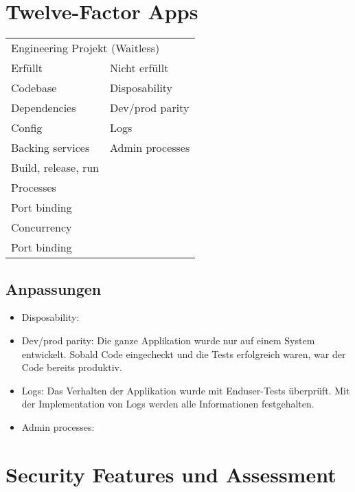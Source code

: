 \documentclass[12pt,a4paper]{article}
\begin{document}
\section{Twelve-Factor Apps}
    \begin{table}[]
        \begin{tabular}{ll}
        \multicolumn{2}{l}{Engineering Projekt (Waitless)} \\
        Erfüllt               & Nicht erfüllt              \\
        Codebase              & Disposability              \\
        Dependencies          & Dev/prod parity            \\
        Config                & Logs                       \\
        Backing services      & Admin processes            \\
        Build, release, run   &                            \\
        Processes             &                            \\
        Port binding          &                            \\
        Concurrency           &                            \\
        Port binding          &                            \\
        \end{tabular}
    \end{table}

\subsection{Anpassungen}
    \begin{itemize}
        \item Disposability:
        \item Dev/prod parity: Die ganze Applikation wurde nur auf einem System entwickelt. Sobald Code eingecheckt und die Tests
              erfolgreich waren, war der Code bereits produktiv.
        \item Logs: Das Verhalten der Applikation wurde mit Enduser-Tests überprüft. Mit der Implementation von Logs werden alle
              Informationen festgehalten.
        \item Admin processes:
    \end{itemize}

\section{Security Features und Assessment}
\end{document}
